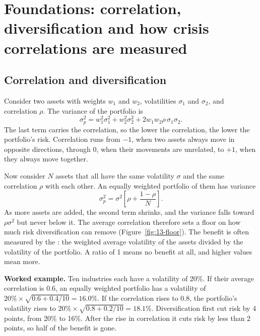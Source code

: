 \section{Foundations: correlation, diversification and how crisis correlations are measured}
\label{sec:13-foundations}

\subsection{Correlation and diversification}

Consider two assets with weights $w_1$ and $w_2$, volatilities $\sigma_1$ and $\sigma_2$, and correlation $\rho$. The variance of the portfolio is
\begin{equation}
  \sigma_p^2 = w_1^2\sigma_1^2 + w_2^2\sigma_2^2 + 2w_1w_2\rho\,\sigma_1\sigma_2.
  \label{eq:13-var2}
\end{equation}
The last term carries the correlation, so the lower the correlation, the lower the portfolio's risk. Correlation runs from $-1$, when two assets always move in opposite directions, through 0, when their movements are unrelated, to $+1$, when they always move together. 

Now consider $N$ assets that all have the same volatility $\sigma$ and the same correlation $\rho$ with each other. An equally weighted portfolio of them has variance
\begin{equation}
  \sigma_p^2 = \sigma^2\left[\rho + \frac{1 - \rho}{N}\right].
  \label{eq:13-varN}
\end{equation}
As more assets are added, the second term shrinks, and the variance falls toward $\rho\sigma^2$ but never below it. The average correlation therefore sets a floor on how much risk diversification can remove (Figure~\ref{fig:13-floor}). The benefit is often measured by the : the weighted average volatility of the assets divided by the volatility of the portfolio. A ratio of 1 means no benefit at all, and higher values mean more.

\textbf{Worked example.} Ten industries each have a volatility of 20\%. If their average correlation is 0.6, an equally weighted portfolio has a volatility of $20\% \times \sqrt{0.6 + 0.4/10} = 16.0\%$. If the correlation rises to 0.8, the portfolio's volatility rises to $20\% \times \sqrt{0.8 + 0.2/10} = 18.1\%$. Diversification first cut risk by 4 points, from 20\% to 16\%. After the rise in correlation it cuts risk by less than 2 points, so half of the benefit is gone.

